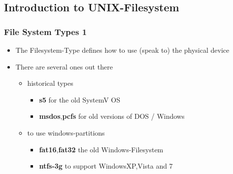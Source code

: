 \documentclass[handout]{beamer}
\begin{document}
	\subsection{Introduction to UNIX-Filesystem}
	    \begin{frame}
			\frametitle{File System Types 1}
			\begin{itemize}
                \item<1-> The Filesystem-Type defines how to use (speak to) the physical device
                \item<1-> There are several ones out there
                \begin{itemize}
                    \item<2-> historical types
                    \begin{itemize}
                        \item<2-> \textbf{s5} for the old SystemV OS
                        \item<2-> \textbf{msdos},\textbf{pcfs} for old versions of DOS / Windows
                    \end{itemize}
                    \item<3-> to use windows-partitions
                    \begin{itemize}
                        \item<3-> \textbf{fat16},\textbf{fat32} the old Windows-Filesystem
                        \item<3-> \textbf{ntfs-3g} to support WindowsXP,Vista and 7
                    \end{itemize}
                \end{itemize}
            \end{itemize}
        \end{frame}
\end{document}
